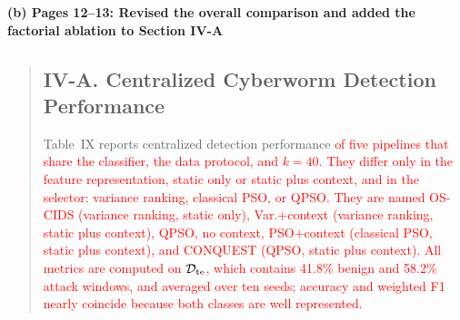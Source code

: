 \documentclass[11pt]{article}
\newenvironment{excerpt}{\begin{quote}\sloppy}{\end{quote}}
\newcommand{\mshead}[2]{\subsection*{\textbf{#1. #2}}}
\newcommand{\loc}[1]{\par\medskip\noindent\textbf{#1}\par}
\begin{document}
\loc{(b) Pages 12--13: Revised the overall comparison and added the factorial ablation to Section IV-A}
\begin{excerpt}
\mshead{IV-A}{Centralized Cyberworm Detection Performance}


Table~IX reports centralized detection
performance \textcolor{red}{of five pipelines that share the
classifier, the data protocol, and $k=40$. They differ only in the
feature representation, static only or static plus context, and in
the selector: variance ranking, classical PSO, or QPSO. They are named
OS-CIDS (variance ranking, static only), Var.+context (variance
ranking, static plus context), QPSO, no context, PSO+context
(classical PSO, static plus context), and CONQUEST (QPSO, static plus
context). All metrics
are computed on $\mathcal{D}_{\rm te}$, which contains 41.8\% benign
and 58.2\% attack windows, and averaged over ten seeds; accuracy and
weighted F1 nearly coincide because both classes are well
represented.}

\setcounter{table}{8}
\begin{table}[H]
\centering
\caption{\textcolor{red}{Centralized detection over ten seeds, with Wilcoxon p-values against CONQUEST. \textsuperscript{\textdagger}Conference result~{[9]}, not directly comparable.}}

\color{red}
\setlength{\tabcolsep}{3pt}
\end{table}


\end{excerpt}
\end{document}
